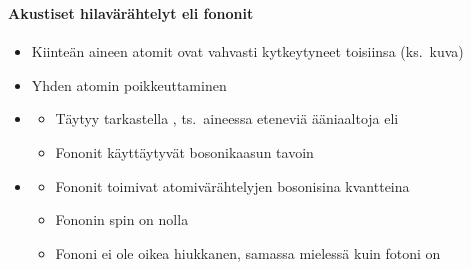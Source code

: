\begin{frame}
\frametitle{\texorpdfstring{\culine[\sectiontitleulinecolor]{\sectiontitle}}{\sectiontitle} }
\framesubtitle{Akustiset hilavärähtelyt eli fononit}
\appear{}

\begin{itemize}
\item Kiinteän aineen atomit ovat vahvasti kytkeytyneet toisiinsa (ks.~kuva)

\item Yhden atomin poikkeuttaminen  
\end{itemize}
	 
\vspace{2.3mm}
\begin{itemize}
	\item[] \begin{itemize}[itemsep=2.2mm] \small
	\item Täytyy tarkastella , ts.~aineessa eteneviä ääniaaltoja eli 
	\item Fononit käyttäytyvät bosonikaasun tavoin 
\end{itemize}
\end{itemize}
\begin{minipage}{7.8cm}
\begin{itemize}
	\item[] \begin{itemize}[itemsep=2.2mm] \small
	\item Fononit toimivat atomivärähtelyjen bosonisina kvantteina
	\item Fononin spin on nolla  
	\item Fononi ei ole oikea hiukkanen, samassa mielessä kuin fotoni on  
\end{itemize}

\end{itemize}
\end{minipage}


\end{frame}
